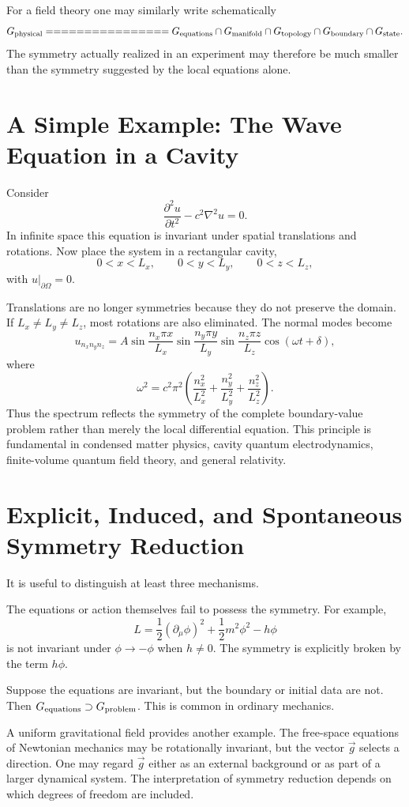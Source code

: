 For a field theory one may similarly write schematically
\[
G_{\rm physical}
================
G_{\rm equations}
\cap
G_{\rm manifold}
\cap
G_{\rm topology}
\cap
G_{\rm boundary}
\cap
G_{\rm state}.
\]
The symmetry actually realized in an experiment may therefore be much smaller
than the symmetry suggested by the local equations alone.

\section{ A Simple Example: The Wave Equation in a Cavity}
Consider
\[\frac{\partial^2 u}{\partial t^2}-c^2\nabla^2u=0.\]
In infinite space this equation is invariant under spatial translations and 
rotations.
Now place the system in a rectangular cavity,
\[0<x<L_x,\qquad 0<y<L_y,\qquad 0<z<L_z,\]
with $u|_{\partial\Omega}=0$.

Translations are no longer symmetries because they do not preserve the domain.
If $L_x\neq L_y\neq L_z$, most rotations are also eliminated.
The normal modes become
\[u_{n_xn_yn_z}=A\sin\frac{n_x\pi x}{L_x}\sin\frac{n_y\pi y}{L_y}
\sin\frac{n_z\pi z}{L_z}\cos(\omega t+\delta),\]
where
\[\omega^2=c^2\pi^2\left(\frac{n_x^2}{L_x^2}+\frac{n_y^2}{L_y^2}
+\frac{n_z^2}{L_z^2}\right).\]
Thus the spectrum reflects the symmetry of the complete boundary-value problem rather than merely the local differential equation.
This principle is fundamental in condensed matter physics, cavity quantum electrodynamics, finite-volume quantum field theory, and general relativity.

\section{Explicit, Induced, and Spontaneous Symmetry Reduction}
It is useful to distinguish at least three mechanisms.

The equations or action themselves fail to possess the symmetry.
For example,
\[L= \frac{1}{2}(\partial_\mu\phi)^2+\frac{1}{2}m^2\phi^2-h\phi\]
is not invariant under $\phi\rightarrow-\phi$ when $h\neq0$.
The symmetry is explicitly broken by the term $h\phi$.

Suppose the equations are invariant, but the boundary or initial data are not.
Then $G_{\rm equations}\supset G_{\rm problem}$.
This is common in ordinary mechanics.

A uniform gravitational field provides another example.  The free-space
equations of Newtonian mechanics may be rotationally invariant, but the vector
$\vec{g}$ selects a direction.
One may regard $\vec{g}$ either as an external background or as part of a
larger dynamical system.  The interpretation of symmetry reduction depends on
which degrees of freedom are included.

